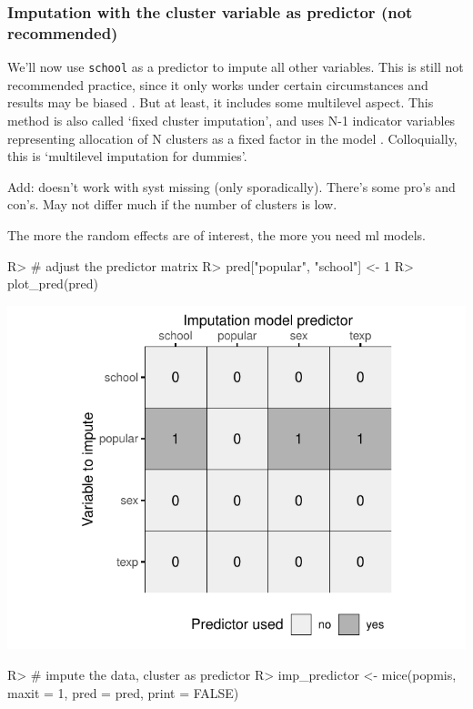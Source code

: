 \documentclass[
]{jss}
\begin{document}
\hypertarget{imputation-with-the-cluster-variable-as-predictor-not-recommended}{%
\subsubsection{Imputation with the cluster variable as predictor (not
recommended)}\label{imputation-with-the-cluster-variable-as-predictor-not-recommended}}

We'll now use \texttt{school} as a predictor to impute all other
variables. This is still not recommended practice, since it only works
under certain circumstances and results may be biased
\citep{drec15, ende16}. But at least, it includes some multilevel
aspect. This method is also called `fixed cluster imputation', and uses
N-1 indicator variables representing allocation of N clusters as a fixed
factor in the model \citep{reit06, ende16}. Colloquially, this is
`multilevel imputation for dummies'.

Add: doesn't work with syst missing (only sporadically). There's some
pro's and con's. May not differ much if the number of clusters is low.

The more the random effects are of interest, the more you need ml
models.

\begin{CodeChunk}
\begin{CodeInput}
R> # adjust the predictor matrix
R> pred["popular", "school"] <- 1 
R> plot_pred(pred)
\end{CodeInput}


\begin{center}\includegraphics{Imputation_of_Incomplete_Multilevel_Data_files/figure-latex/pop_predictor-1} \end{center}

\begin{CodeInput}
R> # impute the data, cluster as predictor
R> imp_predictor <- mice(popmis, maxit = 1, pred = pred, print = FALSE)
\end{CodeInput}
\end{CodeChunk}
\end{document}
